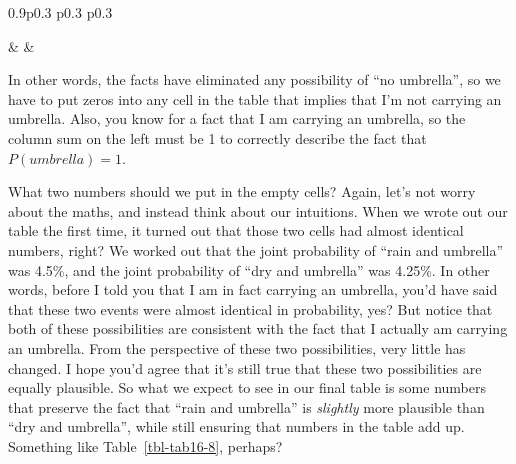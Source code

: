 \documentclass[
  a4paper,
]{book}
\begin{document}
\begin{table}[ht]
\begin{centerbox}
\begin{threeparttable}
\begin{tabularx}{0.9\textwidth}{p{} p{} p{}}
\hhline{}

 &
 &
 \tabularnewline[-0.5pt]


\end{tabularx} 

\end{threeparttable}\par\end{centerbox}

\end{table}
 

In other words, the facts have eliminated any possibility of ``no
umbrella'', so we have to put zeros into any cell in the table that
implies that I'm not carrying an umbrella. Also, you know for a fact
that I am carrying an umbrella, so the column sum on the left must be 1
to correctly describe the fact that \(P(umbrella) = 1\).

What two numbers should we put in the empty cells? Again, let's not
worry about the maths, and instead think about our intuitions. When we
wrote out our table the first time, it turned out that those two cells
had almost identical numbers, right? We worked out that the joint
probability of ``rain and umbrella'' was 4.5\%, and the joint
probability of ``dry and umbrella'' was 4.25\%. In other words, before I
told you that I am in fact carrying an umbrella, you'd have said that
these two events were almost identical in probability, yes? But notice
that both of these possibilities are consistent with the fact that I
actually am carrying an umbrella. From the perspective of these two
possibilities, very little has changed. I hope you'd agree that it's
still true that these two possibilities are equally plausible. So what
we expect to see in our final table is some numbers that preserve the
fact that ``rain and umbrella'' is \emph{slightly} more plausible than
``dry and umbrella'', while still ensuring that numbers in the table add
up. Something like Table~\ref{tbl-tab16-8}, perhaps?
\end{document}
